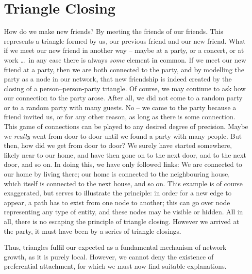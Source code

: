 \documentclass{jimis}
\begin{document}
\section{Triangle Closing}
How do we make new friends?  By meeting the friends of our friends.
This represents a triangle formed by us, our previous friend and our
new friend.  What if we meet our new friend in another way -- maybe at a
party, or a concert, or at work \ldots\ in any case there is always
\emph{some} element in common. If we meet our new friend at a party, then
we are both connected to the party, and by modelling the party as a node
in our network, that new friendship is indeed created by the closing of
a person--person-party triangle.  Of course, we may continue to ask how
our connection to the party 
arose.  After all, we did not come to a random party or to a
random party with many guests.  No -- we came to the party because a
friend invited us, or for any other reason, as long as there is some
connection.  This game of connections can be played to any
desired degree of precision.  Maybe we \emph{really} went from door to
door until we found a party with many people.  But then, how did we get
from door to door?  We surely have started somewhere, likely near to our
home, and have then gone on to the next door, and to the next door, and
so on.  In doing this, we have only followed links:  We are connected to
our home by living there;  our home is connected to the neighbouring
house, which itself is connected to the next house, and so on. 
This example is of course exaggerated, but serves to illustrate the
principle:  in order for a new edge to appear, a path has to exist from
one node to another; this can go over node representing any type of
entity, and these nodes may be visible or hidden. 
All in 
all, there is no escaping the principle of triangle closing.  However we
arrived at the party, it must have been by a series of triangle
closings.  

Thus, triangles fulfil our expected as a fundamental mechanism of
network growth, as it is purely local. 
However, we cannot deny the existence of preferential attachment, for which
we must now find suitable explanations. 
\end{document}
